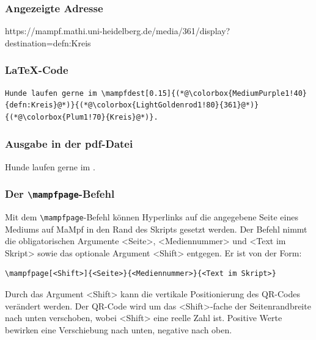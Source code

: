 \documentclass[parskip=off,index=totocnumbered]{scrartcl}
\begin{document}
\subsubsection*{Angezeigte Adresse}
https://mampf.mathi.uni-heidelberg.de/media/\colorbox{LightGoldenrod1!80}{361}/display?destination=\colorbox{MediumPurple1!40}{defn:Kreis}

\subsubsection*{\LaTeX-Code}
\vspace{-0.2cm}
   \begin{lstlisting}   
Hunde laufen gerne im \mampfdest[0.15]{(*@\colorbox{MediumPurple1!40}{defn:Kreis}@*)}{(*@\colorbox{LightGoldenrod1!80}{361}@*)}{(*@\colorbox{Plum1!70}{Kreis}@*)}. 
   \end{lstlisting}
\vspace{0.2cm}

\subsubsection*{Ausgabe in der pdf-Datei}
Hunde laufen gerne im . 
\vspace{0.4cm}
   
   
\subsubsection{Der \texttt{\textbackslash mampfpage}-Befehl} \label{subsubsec:page}
Mit dem \verb|\mampfpage|-Befehl können Hyperlinks auf die angegebene Seite eines Mediums auf MaMpf in den Rand des Skripts gesetzt werden. Der Befehl nimmt die obligatorischen Argumente <Seite>, <Mediennummer> und <Text im Skript> sowie das optionale Argument <Shift> entgegen. Er ist von der Form:
   \begin{verbatim}
\mampfpage[<Shift>]{<Seite>}{<Mediennummer>}{<Text im Skript>}
   \end{verbatim}
\vspace{-0.5cm}
Durch das Argument <Shift> kann die vertikale Positionierung des QR-Codes verändert werden. Der QR-Code wird um das <Shift>-fache der Seitenrandbreite nach unten verschoben, wobei <Shift> eine reelle Zahl ist. Positive Werte bewirken eine Verschiebung nach unten, negative nach oben.  
\end{document}
